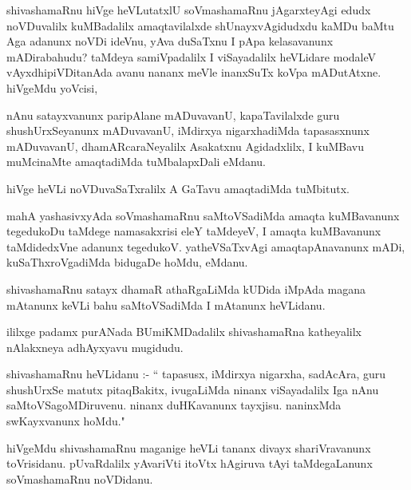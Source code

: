 \documentclass{article}
\begin{document}
\begin{mn}
shivashamaRnu hiVge heVLutatxlU soVmashamaRnu jAgarxteyAgi edudx 
noVDuvalilx kuMBadalilx amaqtavilalxde shUnayxvAgidudxdu kaMDu baMtu 
Aga adanunx noVDi ideVnu, yAva duSaTxnu I pApa kelasavanunx mADirabahudu?
taMdeya samiVpadalilx I viSayadalilx heVLidare modaleV vAyxdhipiVDitanAda 
avanu nananx meVle inanxSuTx koVpa mADutAtxne. hiVgeMdu yoVcisi,
\end{mn}

\begin{mn}
nAnu satayxvanunx paripAlane mADuvavanU, kapaTavilalxde guru shushUrxSeyanunx
mADuvavanU, iMdirxya nigarxhadiMda tapasasxnunx mADuvavanU, dhamARcaraNeyalilx 
Asakatxnu Agidadxlilx, I kuMBavu muMcinaMte amaqtadiMda tuMbalapxDali eMdanu. 
\end{mn}

\begin{mn}
hiVge heVLi noVDuvaSaTxralilx A GaTavu amaqtadiMda tuMbitutx.
\end{mn}

\begin{mn}
mahA yashasivxyAda soVmashamaRnu saMtoVSadiMda amaqta kuMBavanunx 
tegedukoDu taMdege namasakxrisi eleY taMdeyeV, I amaqta kuMBavanunx 
taMdidedxVne adanunx tegedukoV. yatheVSaTxvAgi amaqtapAnavanunx mADi, 
kuSaThxroVgadiMda bidugaDe hoMdu, eMdanu. 
\end{mn}

\begin{mn}
shivashamaRnu satayx dhamaR athaRgaLiMda kUDida iMpAda magana mAtanunx 
keVLi bahu saMtoVSadiMda I mAtanunx heVLidanu. 
\end{mn}

\begin{mn}
ililxge padamx purANada BUmiKMDadalilx shivashamaRna katheyalilx
nAlakxneya adhAyxyavu mugidudu.
\end{mn}




\begin{mn}
shivashamaRnu heVLidanu :- `` tapasusx, iMdirxya nigarxha, sadAcAra,
guru shushUrxSe matutx pitaqBakitx, ivugaLiMda ninanx viSayadalilx Iga nAnu
saMtoVSagoMDiruvenu. ninanx duHKavanunx tayxjisu. naninxMda swKayxvanunx hoMdu."
\end{mn}

\begin{mn}
hiVgeMdu shivashamaRnu maganige heVLi tananx divayx shariVravanunx toVrisidanu.
pUvaRdalilx yAvariVti itoVtx hAgiruva tAyi taMdegaLanunx soVmashamaRnu noVDidanu. 
\end{mn}
\end{document}
